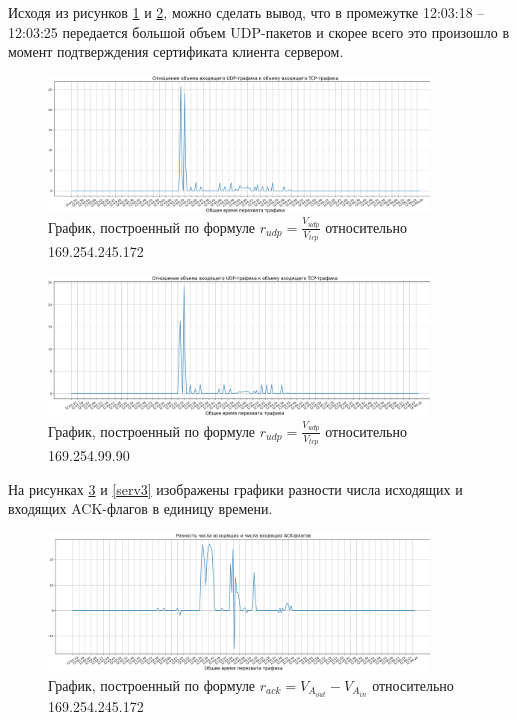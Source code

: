 \documentclass[bachelor, och, coursework]{SCWorks}
\begin{document}
  Исходя из рисунков \ref{clnt2} и \ref{serv2}, можно сделать вывод, что в промежутке 12:03:18 -- 12:03:25 передается большой объем UDP-пакетов и 
  скорее всего это произошло в момент подтверждения сертификата клиента сервером.

  \begin{figure}[H]
    \centering
    \includegraphics[width=0.9\textwidth]{photo/clnt2.png}
    \caption{График, построенный по формуле $r_{udp} = \frac{V_{udp}}{V_{tcp}}$ относительно 169.254.245.172}
    \label{clnt2}
  \end{figure}

  \begin{figure}[H]
    \centering
    \includegraphics[width=0.9\textwidth]{photo/serv2.png}
    \caption{График, построенный по формуле $r_{udp} = \frac{V_{udp}}{V_{tcp}}$ относительно 169.254.99.90}
    \label{serv2}
  \end{figure}

  На рисунках \ref{clnt3} и \ref{serv3} изображены графики разности числа исходящих и входящих ACK-флагов в единицу времени.

  \begin{figure}[H]
    \centering
    \includegraphics[width=0.9\textwidth]{photo/clnt3.png}
    \caption{График, построенный по формуле $r_{ack} = V_{A_{out}} - V_{A_{in}}$ относительно 169.254.245.172}
    \label{clnt3}
  \end{figure}
\end{document}
